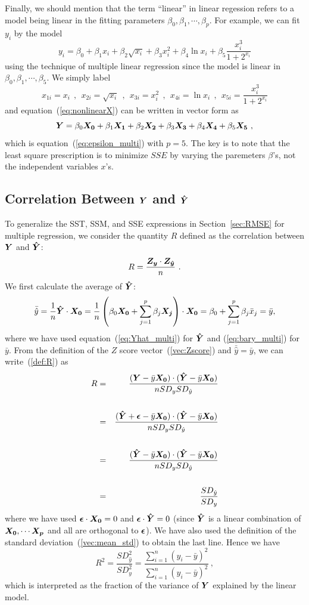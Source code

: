 \documentclass[11pt]{article}
\newcommand{\beq}{\begin{equation}}
\newcommand{\eeq}{\end{equation}}
\newcommand{\beqn}{\begin{eqnarray}}
\newcommand{\eeqn}{\end{eqnarray}}
\newcommand{\ve}[1]{\mbox{\boldmath $#1$}}
\begin{document}
Finally, we should mention that the term ``linear'' in linear regession 
refers to a model being linear in the fitting parameters 
$\beta_0,\beta_1,\cdots,\beta_p$. For example, we can fit $y_i$ by the 
model 
\beq
  y_i = \beta_0 + \beta_1 x_i + \beta_2 \sqrt{x_i} + \beta_3 x_i^2 + \beta_4 \ln x_i 
+ \beta_5 \frac{x_i^3}{1+2^{x_i}}
\label{eq:nonlinearX}
\eeq
using the technique of multiple linear regression since the model is 
linear in $\beta_0,\beta_1,\cdots,\beta_5$. We simply label 
\[
  x_{1i} = x_i \ \ , \ \ x_{2i}=\sqrt{x_i} \ \ , \ \ x_{3i}=x_i^2 \ \ , \ \ 
  x_{4i}=\ln x_i \ \ , \ \ x_{5i}= \frac{x_i^3}{1+2^{x_i}}
\]
and equation~(\ref{eq:nonlinearX}) can be written in vector form as 
\[
  \ve{Y}=\beta_0 \ve{X_0} + \beta_1 \ve{X_1} + \beta_2 \ve{X_2} + \beta_3 \ve{X_3} 
+ \beta_4 \ve{X_4} + \beta_5 \ve{X_5} \ ,
\]
which is equation~(\ref{eq:epsilon_multi}) with $p=5$. The key is to note that 
the least square prescription is to minimize $SSE$ by varying the paremeters 
$\beta$'s, not the independent variables $x$'s.

\subsection{Correlation Between $\ve{Y}$ and $\ve{\hat{Y}}$}
\label{sec:R_multi}

To generalize the SST, SSM, and SSE expressions in Section~\ref{sec:RMSE} for multiple 
regression, we 
consider the quantity $R$ defined as the correlation between $\ve{Y}$ and 
$\ve{\hat{Y}}$: 
\beq
 R = \frac{\ve{Z_y} \cdot \ve{Z_{\hat{y}}}}{n}  \ .
\label{def:R}
\eeq
We first calculate the average of $\ve{\hat{Y}}$: 
\[
  \bar{\hat{y}} = \frac{1}{n} \ve{\hat{Y}} \cdot \ve{X_0} 
= \frac{1}{n} \left( \beta_0 \ve{X_0} + \sum_{j=1}^p \beta_j \ve{X_j}\right) 
\cdot \ve{X_0} 
= \beta_0 + \sum_{j=1}^p \beta_j \bar{x}_j = \bar{y} ,
\]
where we have used equation~(\ref{eq:Yhat_multi}) for $\ve{\hat{Y}}$ and 
(\ref{eq:bary_multi}) for $\bar{y}$. From the definition of the $Z$ score 
vector~(\ref{vec:Zscore}) and $\bar{\hat{y}}=\bar{y}$, we can write~(\ref{def:R}) as 
\beqn
  R &=& \frac{(\ve{Y}-\bar{y} \ve{X_0})\cdot (\ve{\hat{Y}}-\bar{y} \ve{X_0})} 
{n SD_y SD_{\hat{y}}}  \cr \cr 
  &=& \frac{(\ve{\hat{Y}}+\ve{\epsilon}-\bar{y} \ve{X_0})\cdot (\ve{\hat{Y}}-\bar{y} \ve{X_0})}
{n SD_y SD_{\hat{y}}}  \cr \cr 
&=& \frac{(\ve{\hat{Y}}-\bar{y} \ve{X_0})\cdot (\ve{\hat{Y}}-\bar{y} \ve{X_0})}
{n SD_y SD_{\hat{y}}}  \cr \cr 
&=& \frac{SD_{\hat{y}}}{SD_y} 
\label{eq:R}
\eeqn
where we have used $\ve{\epsilon}\cdot \ve{X_0}=0$ and $\ve{\epsilon}\cdot \ve{\hat{Y}}=0$ 
(since $\ve{\hat{Y}}$ is a linear combination of $\ve{X_0},\cdots \ve{X_p}$ and all 
are orthogonal to $\ve{\epsilon}$). We have also used the definition of the 
standard deviation~(\ref{vec:mean_std}) to obtain the last line. Hence we have 
\beq
  R^2 = \frac{SD_{\hat{y}}^2}{SD_y^2} = \frac{\sum\limits_{i=1}^n (\hat{y}_i-\bar{y})^2}
{\sum\limits_{i=1}^n (y_i-\bar{y})^2} \ ,
\label{eq:R2}
\eeq
which is interpreted as the fraction of the variance of $\ve{Y}$ explained by 
the linear model.
\end{document}
